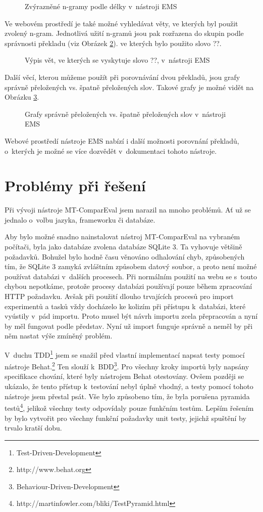 \begin{figure}
  \caption{Zvýrazněné \mbox{n-gramy} podle délky v~nástroji EMS}
  \label{img:ems-sentence}
\end{figure}

Ve webovém prostředí je také možné vyhledávat věty,
  ve kterých byl použit zvolený \mbox{n-gram}.
Jednotlivá užití \mbox{n-gramů} jsou pak rozřazena do skupin podle správnosti překladu (viz Obrázek \ref{img:ems-word}).
  ve kterých bylo použito slovo ??.

\begin{figure}
  \caption{Výpis vět, ve kterých se vyskytuje slovo ??, v~nástroji EMS}
  \label{img:ems-word}
\end{figure}

Další věcí, kterou můžeme použít při porovnávání dvou překladů,
  jsou grafy správně přeložených vs. špatně přeložených slov.
Takové grafy je možné vidět na Obrázku \ref{img:ems-charts}.

\begin{figure}
  \caption{Grafy správně přeložených vs. špatně přeložených slov v~nástroji EMS}
  \label{img:ems-charts}
\end{figure}

Webové prostředí nástroje EMS nabízí i další možnosti porovnání překladů,
  o~kterých je možné se více dozvědět v~dokumentaci tohoto nástroje.

\section{Problémy při řešení}
Při vývoji nástroje \mbox{MT-ComparEval} jsem narazil na mnoho problémů.
Ať už se jednalo o~volbu jazyka, frameworku či databáze.

Aby bylo možné snadno nainstalovat nástroj \mbox{MT-ComparEval} na vybraném počítači,
  byla jako databáze zvolena databáze SQLite 3.
Ta vyhovuje většině požadavků.
Bohužel bylo hodně času věnováno odhalování chyb,
  způsobených tím,
  že SQLite 3 zamyká zvláštním způsobem datový soubor,
  a proto není možné používat databázi v~dalších procesech.
Při normálním použití na webu se s~touto chybou nepotkáme,
  protože procesy databázi používají pouze během zpracování HTTP požadavku.
Avšak při použití dlouho trvajících procesů pro import experimentů a tasků
  vždy docházelo ke kolizím při přístupu k~databázi,
  které vyústily v~pád importu.
Proto musel být návrh importu zcela přepracován a nyní by měl fungovat podle představ.
Nyní už import funguje správně a neměl by při něm nastat výše zmíněný problém.


V~duchu TDD\footnote{Test-Driven-Development}
  jsem se snažil před vlastní implementací napsat testy pomocí nástroje Behat.\footnote{http://www.behat.org}
Ten slouží k~BDD\footnote{Behaviour-Driven-Development}.
Pro všechny kroky importů byly napsány specifikace chování, které byly nástrojem Behat otestovány.
Ovšem později se ukázalo, že tento přístup k~testování nebyl úplně vhodný, a testy pomocí tohoto nástroje jsem přestal psát.
Vše bylo způsobeno tím, že byla porušena pyramida testů\footnote{http://martinfowler.com/bliki/TestPyramid.html},
  jelikož všechny testy odpovídaly pouze funkčním testům.
Lepším řešením by bylo vytvořit pro všechny funkční požadavky unit testy,
  jejichž spuštění by trvalo kratší dobu.
